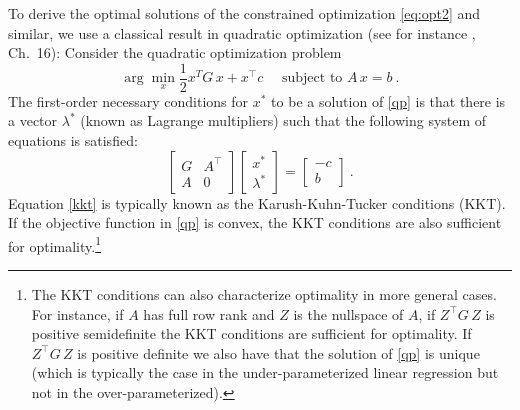 \documentclass[12pt,letterpaper]{article}
\begin{document}
To derive the optimal solutions of the constrained optimization \eqref{eq:opt2} and similar, we use a classical result in quadratic optimization (see for instance \citealt{nocedal2006numerical}, Ch.~16):
Consider the quadratic optimization problem 
\begin{equation} \label{qp}
    \arg\min_x \frac{1}{2} x^T G\, x + x^\top c \quad \text{ subject to } A\,x=b
    ~.
\end{equation}
The first-order necessary conditions for $x^*$ to be a solution of \eqref{qp} is that there is a vector $\lambda^*$ (known as Lagrange multipliers) such that the following system of equations is satisfied:
\begin{equation}
    \left[
    \begin{matrix}
    G & A^\top \\ 
    A & 0
    \end{matrix}\right]
    \left[
    \begin{matrix}
    x^* \\ 
    \lambda^*
    \end{matrix}\right] = 
    \left[
    \begin{matrix}
    -c \\ 
    b
    \end{matrix}\right]
    ~.
    \label{kkt}
\end{equation}
Equation \eqref{kkt} is typically known as the Karush-Kuhn-Tucker conditions (KKT). If the objective function in \eqref{qp} is convex, the KKT conditions are also sufficient for optimality.\footnote{The KKT conditions can also characterize optimality in more general cases. For instance, if $A$ has full row rank and $Z$ is the nullspace of $A$, if $Z^\top G\, Z$ is positive semidefinite the KKT conditions are sufficient for optimality. If $Z^\top G\, Z$ is positive definite we also have that the solution of \eqref{qp} is unique (which is typically the case in the under-parameterized linear regression but not in the over-parameterized).}
\end{document}
